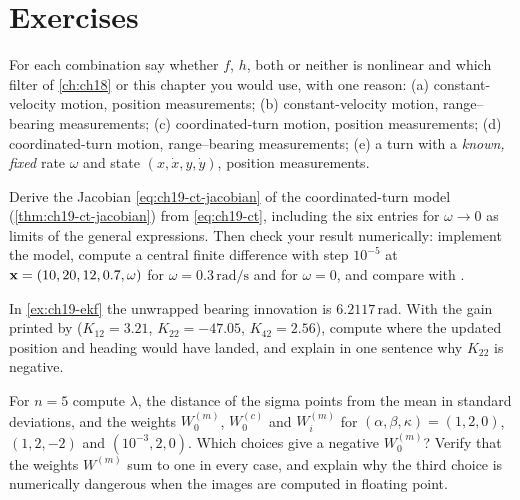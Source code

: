 \section{Exercises}
\label{sec:ch19-exercises}

\begin{exercise}[\difficulty{1}]
\label{exr:ch19-which}
For each combination say whether $f$, $h$, both or neither is nonlinear and
which filter of \cref{ch:ch18} or this chapter you would use, with one
reason: (a) constant-velocity motion, position measurements; (b)
constant-velocity motion, range--bearing measurements; (c) coordinated-turn
motion, position measurements; (d) coordinated-turn motion, range--bearing
measurements; (e) a turn with a \emph{known, fixed} rate $\omega$ and state
$(x, \dot{x}, y, \dot{y})$, position measurements.
\end{exercise}

\begin{exercise}[\difficulty{2}]
\label{exr:ch19-ct-jacobian}
Derive the Jacobian \cref{eq:ch19-ct-jacobian} of the coordinated-turn
model (\cref{thm:ch19-ct-jacobian}) from \cref{eq:ch19-ct}, including the six entries for $\omega \to 0$
as limits of the general expressions. Then check your result numerically:
implement the model, compute a central finite difference with step
$10^{-5}$ at $\mathbf{x} = (10, 20, 12, 0.7, \omega)$ for $\omega =
0.3\,\mathrm{rad/s}$ and for $\omega = 0$, and compare with
.
\end{exercise}

\begin{exercise}[\difficulty{1}]
\label{exr:ch19-wrapping}
In \cref{ex:ch19-ekf} the unwrapped bearing innovation is $6.2117\,\mathrm{rad}$.
With the gain printed by  ($K_{12} = 3.21$, $K_{22}
= -47.05$, $K_{42} = 2.56$), compute where the updated position and heading
would have landed, and explain in one sentence why $K_{22}$ is negative.
\end{exercise}

\begin{exercise}[\difficulty{2}]
\label{exr:ch19-weights}
For $n = 5$ compute $\lambda$, the distance of the sigma points from the
mean in standard deviations, and the weights $W_0^{(m)}$, $W_0^{(c)}$ and
$W_i^{(m)}$ for $(\alpha, \beta, \kappa) = (1, 2, 0)$, $(1, 2, -2)$ and
$(10^{-3}, 2, 0)$. Which choices give a negative $W_0^{(m)}$? Verify that
the weights $W^{(m)}$ sum to one in every case, and explain why the third
choice is numerically dangerous when the images are computed in floating
point.
\end{exercise}

